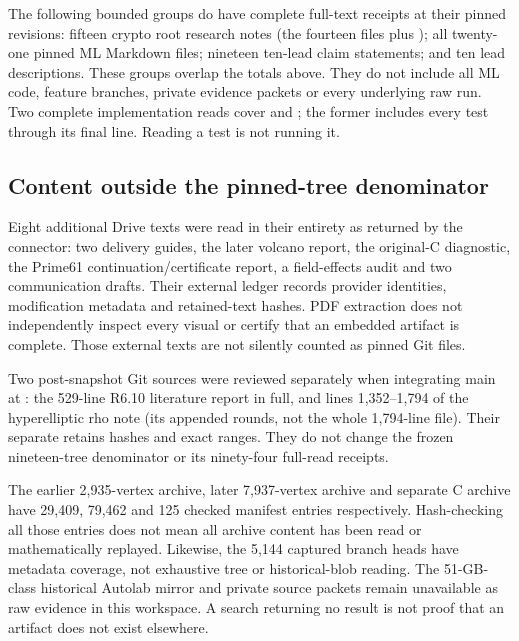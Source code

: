 The following bounded groups do have complete full-text receipts at
their pinned revisions: fifteen crypto root research notes (the fourteen
 files plus );
all twenty-one pinned ML Markdown files; nineteen ten-lead claim statements;
and ten lead descriptions. These groups overlap the totals above. They
do not include all ML code, feature branches, private evidence packets
or every underlying raw run. Two complete implementation reads cover
 and ; the former
includes every test through its final line. Reading a test is not running it.

\subsection{Content outside the pinned-tree denominator}

Eight additional Drive texts were read in their entirety as returned by
the connector: two delivery guides, the later volcano report, the
original-C diagnostic, the Prime61 continuation/certificate report, a
field-effects audit and two communication drafts. Their external ledger
records provider identities, modification metadata and retained-text
hashes. PDF extraction does not independently inspect every visual or
certify that an embedded artifact is complete. Those external texts are
not silently counted as pinned Git files.

Two post-snapshot Git sources were reviewed separately when integrating
main at : the 529-line
R6.10 literature report in full, and lines 1,352--1,794 of the
hyperelliptic rho note (its appended rounds, not the whole 1,794-line
file). Their separate 
retains hashes and exact ranges. They do not change the frozen
nineteen-tree denominator or its ninety-four full-read receipts.

The earlier 2,935-vertex archive, later 7,937-vertex archive and separate C
archive have 29,409, 79,462 and 125 checked manifest entries respectively.
Hash-checking all those entries does not mean all archive content has been
read or mathematically replayed. Likewise, the 5,144 captured branch heads
have metadata coverage, not exhaustive tree or historical-blob reading.
The 51-GB-class historical Autolab mirror and private source packets
remain unavailable as raw evidence in this workspace. A search returning
no result is not proof that an artifact does not exist elsewhere.

